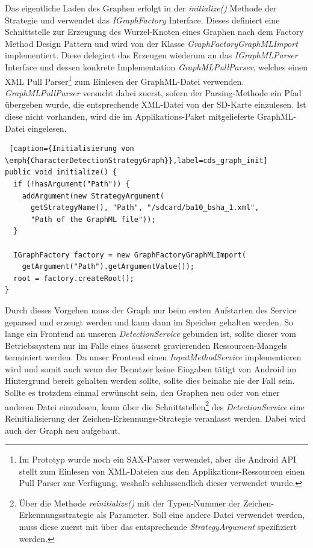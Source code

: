 Das eigentliche Laden des Graphen erfolgt in der \emph{initialize()} Methode der Strategie und verwendet das \emph{IGraphFactory} Interface. Dieses definiert eine Schnittstelle zur Erzeugung des Wurzel-Knoten eines Graphen nach dem Factory Method Design Pattern\cite[S.107-116]{designpatterns} und wird von der Klasse \emph{GraphFactoryGraphMLImport} implementiert. Diese delegiert das Erzeugen wiederum an das \emph{IGraphMLParser} Interface und dessen konkrete Implementation \emph{GraphMLPullParser}, welches einen XML Pull Parser\footnote{Im Prototyp wurde noch ein SAX-Parser verwendet, aber die Android API stellt zum Einlesen von XML-Dateien aus den Applikations-Ressourcen einen Pull Parser zur Verfügung, weshalb schlussendlich dieser verwendet wurde.} zum Einlesen der GraphML-Datei verwenden. \emph{GraphMLPullParser} versucht dabei zuerst, sofern der Parsing-Methode ein Pfad übergeben wurde, die entsprechende XML-Datei von der SD-Karte einzulesen. Ist diese nicht vorhanden, wird die im Applikations-Paket mitgelieferte GraphML-Datei eingelesen.

\begin{lstlisting} [caption={Initialisierung von \emph{CharacterDetectionStrategyGraph}},label=cds_graph_init]
public void initialize() {
  if (!hasArgument("Path")) {
    addArgument(new StrategyArgument(
      getStrategyName(), "Path", "/sdcard/ba10_bsha_1.xml", 
      "Path of the GraphML file"));
  }

  IGraphFactory factory = new GraphFactoryGraphMLImport(
    getArgument("Path").getArgumentValue());
  root = factory.createRoot();	
}
\end{lstlisting}

Durch dieses Vorgehen muss der Graph nur beim ersten Aufstarten des Service geparsed und erzeugt werden und kann dann im Speicher gehalten werden. So lange ein Frontend an unseren \emph{DetectionService} gebunden ist, sollte dieser vom Betriebssystem nur im Falle eines äusserst gravierenden Ressourcen-Mangels terminiert werden. Da unser Frontend einen \emph{InputMethodService} implementieren wird und somit auch wenn der Benutzer keine Eingaben tätigt von Android im Hintergrund bereit gehalten werden sollte, sollte dies beinahe nie der Fall sein. Sollte es trotzdem einmal erwünscht sein, den Graphen neu oder von einer anderen Datei einzulesen, kann über die Schnittstellen\footnote{Über die Methode \emph{reinitialize()} mit der Typen-Nummer der Zeichen-Erkennungsstrategie als Parameter. Soll eine andere Datei verwendet werden, muss diese zuerst mit über das entsprechende \emph{StrategyArgument} spezifiziert werden.} des \emph{DetectionService} eine Reinitialisierung der Zeichen-Erkennungs-Strategie veranlasst werden. Dabei wird auch der Graph neu aufgebaut.

